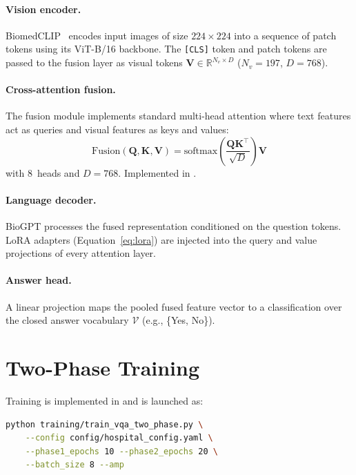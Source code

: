 \paragraph{Vision encoder.}
BiomedCLIP~\citep{zhang2023biomedclip} encodes input images of size
$224 \times 224$ into a sequence of patch tokens using its ViT-B/16
backbone. The \texttt{[CLS]} token and patch tokens are passed to the
fusion layer as visual tokens $\mathbf{V} \in \mathbb{R}^{N_v \times D}$
($N_v = 197$, $D = 768$).

\paragraph{Cross-attention fusion.}
The fusion module implements standard multi-head attention where text
features act as queries and visual features as keys and values:
\begin{equation}
  \mathrm{Fusion}(\mathbf{Q}, \mathbf{K}, \mathbf{V}) =
  \mathrm{softmax}\!\left(\frac{\mathbf{Q}\mathbf{K}^\top}{\sqrt{D}}\right)
  \mathbf{V}
  \label{eq:crossattn}
\end{equation}
with 8~heads and $D=768$. Implemented in
.

\paragraph{Language decoder.}
BioGPT processes the fused representation conditioned on the question
tokens. LoRA adapters (Equation~\ref{eq:lora}) are injected into the
query and value projections of every attention layer.

\paragraph{Answer head.}
A linear projection maps the pooled fused feature vector to a
classification over the closed answer vocabulary
$\mathcal{V}$ (e.g., \{Yes, No\}).

\section{Two-Phase Training}
\label{sec:training}

Training is implemented in
 and is launched as:
\begin{lstlisting}[language=bash, caption={Launching two-phase training.},
                   label={lst:train}]
python training/train_vqa_two_phase.py \
    --config config/hospital_config.yaml \
    --phase1_epochs 10 --phase2_epochs 20 \
    --batch_size 8 --amp
\end{lstlisting}

